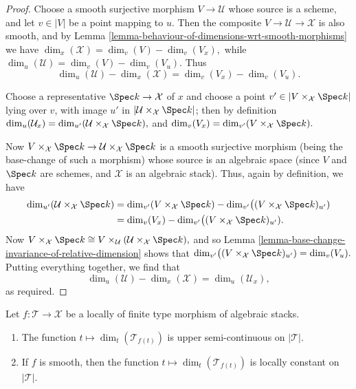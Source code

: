 \begin{proof}
Choose a smooth surjective morphism $V \to \mathcal{U}$ whose source
is a scheme, and let $v\in |V|$ be a point mapping to $u$.
Then the composite $V \to \mathcal{U} \to \mathcal{X}$ is also smooth,
and by Lemma \ref{lemma-behaviour-of-dimensions-wrt-smooth-morphisms}
we have $\dim_x(\mathcal{X}) = \dim_v(V) - \dim_v(V_x),$
while $\dim_u(\mathcal{U}) = \dim_v(V) - \dim_v(V_u).$
Thus
$$
\dim_u(\mathcal{U}) - \dim_x(\mathcal{X}) = \dim_v (V_x) - \dim_v (V_u).
$$

\medskip\noindent
Choose a representative $\Spec k \to \mathcal{X}$ of $x$
and choose a point $v' \in | V \times_{\mathcal{X}} \Spec k|$ lying over
$v$, with image $u'$ in $|\mathcal{U}\times_{\mathcal{X}} \Spec k|$;
then by definition
$\dim_u(\mathcal{U}_x) = \dim_{u'}(\mathcal{U}\times_{\mathcal{X}} \Spec k),$
and
$\dim_v(V_x) = \dim_{v'}(V\times_{\mathcal{X}} \Spec k).$

\medskip\noindent
Now $V\times_{\mathcal{X}} \Spec k \to \mathcal{U}\times_{\mathcal{X}}\Spec k$
is a smooth surjective morphism (being the base-change
of such a morphism) whose source is an algebraic space
(since $V$ and $\Spec k$ are schemes, and $\mathcal{X}$
is an algebraic stack).  Thus, again by definition,
we have
\begin{align*}
\dim_{u'}(\mathcal{U}\times_{\mathcal{X}} \Spec k)
& =
\dim_{v'}(V\times_{\mathcal{X}} \Spec k) -
\dim_{v'}\bigl( (V\times_{\mathcal{X}} \Spec k)_{u'}) \\
& = \dim_v(V_x) -
\dim_{v'}\bigl( (V\times_{\mathcal{X}} \Spec k)_{u'}).
\end{align*}
Now $V\times_{\mathcal{X}} \Spec k \cong
V\times_{\mathcal{U}} (\mathcal{U}\times_{\mathcal{X}} \Spec k),$
and so
Lemma \ref{lemma-base-change-invariance-of-relative-dimension}
shows that
$\dim_{v'}\bigl( (V\times_{\mathcal{X}} \Spec k)_{u'})  = \dim_v(V_u).$
Putting everything together, we find that
$$
\dim_u(\mathcal{U}) - \dim_x(\mathcal{X}) =
\dim_u(\mathcal{U}_x),
$$
as required.
\end{proof}

\begin{lemma}
\label{lemma-relative-dimension-is-semi-continuous}
Let $f: \mathcal{T} \to \mathcal{X}$ be a locally of finite type morphism of
algebraic stacks.
\begin{enumerate}
\item
The function $t \mapsto \dim_t(\mathcal{T}_{f(t)})$ is upper semi-continuous
on $|\mathcal{T}|$.
\item If $f$ is smooth, then
the function $t \mapsto \dim_t(\mathcal{T}_{f(t)})$ is locally constant
on $|\mathcal{T}|$.
\end{enumerate}
\end{lemma}

